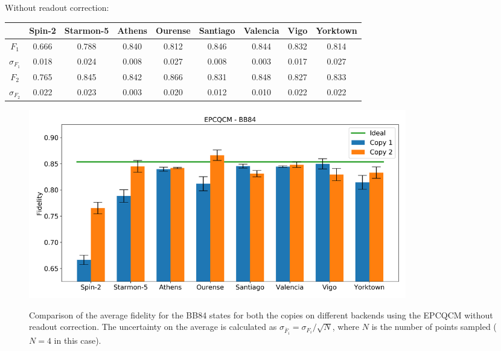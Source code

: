 Without readout correction:
\begin{table}[H]
    \centering
    \begin{tabular}{|c|c|c|c|c|c|c|c|c|}
    \hline
    \textbf{} & \textbf{Spin-2} & \textbf{Starmon-5} & \textbf{Athens} & \textbf{Ourense} & \textbf{Santiago} & \textbf{Valencia} & \textbf{Vigo} & \textbf{Yorktown} \\ \hline
    $F_1$              & 0.666  & 0.788 & 0.840 & 0.812 & 0.846 & 0.844 & 0.832 & 0.814 \\ \hline
    $\sigma_{F_1}$     & 0.018  & 0.024 & 0.008 & 0.027 & 0.008 & 0.003 & 0.017 & 0.027 \\ \hline
    $F_2$              & 0.765  & 0.845 & 0.842 & 0.866 & 0.831 & 0.848 & 0.827 & 0.833 \\ \hline
    $\sigma_{F_2}$     & 0.022  & 0.023 & 0.003 & 0.020 & 0.012 & 0.010 & 0.022 & 0.022 \\ \hline
    \end{tabular}
\end{table}
\begin{figure}[H]
  \centering
          \includegraphics[width=0.8\textwidth]{Figures/Economical/Histograms/histo_bb84.png}
      \label{fig:epc_histo_bb84_not_corrected}
      \caption{Comparison of the average fidelity for the BB84 states for both the copies on different backends using the EPCQCM without readout correction. The uncertainty on the average is calculated as $\sigma_{\overline{F}_i}=\sigma_{F_i}/\sqrt{N}$, where $N$ is the number of points sampled ($N=4$ in this case).}
\end{figure}
